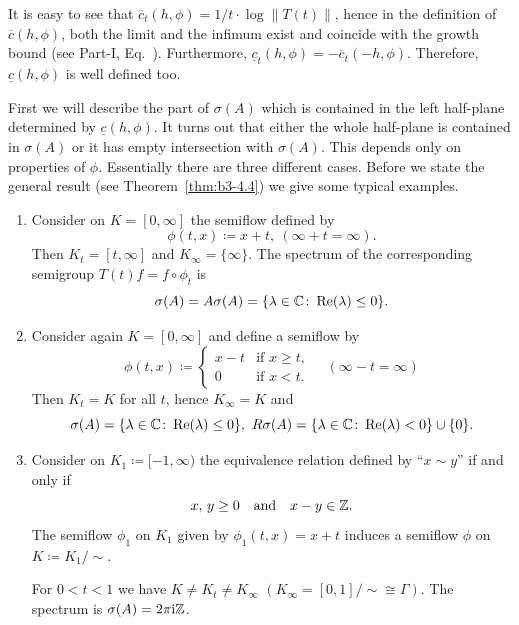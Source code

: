 It is easy to see that $\overline{c}_{t}(h,\phi) = 1/t\cdot\log\|T(t)\|$, hence in the definition of\/ $\overline{c}(h,\phi)$, both the limit and the infimum exist and coincide with the growth bound (see Part-I, Eq.~).
Furthermore, $\underline{c}_{t}(h,\phi) = -\overline{c}_{t}(-h,\phi)$.
Therefore, $\underline{c}(h,\phi)$ is well defined too.

First we will describe the part of\/ $\sigma(A)$ which is contained in the left half-plane determined by $\underline{c}(h,\phi)$.
It turns out that either the whole half-plane is contained in $\sigma(A)$ or it has empty intersection with $\sigma(A)$.
This depends only on properties of\/ $\phi$.
Essentially there 
are three different cases. 
Before we state the general result (see Theorem~\ref{thm:b3-4.4}) we give some typical examples.
\begin{examples}\label{ex:b3-4.3}
	\begin{enumerate}[\upshape (i), wide, labelindent=.25em]
	\item 
	Consider on $K = [0,\infty]$ the semiflow defined by 
    \[
    \phi(t,x) \coloneq x + t,\ (\infty + t = \infty) .
    \]
	Then $K_{t} = [t,\infty]$ and $K_{\infty} = \{\infty\}$.
	The spectrum of the corresponding semigroup $T(t)f = f\circ\phi_{t}$ is 
    \[
    \sigma(A) = A\sigma(A) = 
    \{\lambda \in \C \colon \Re(\lambda) \leq 0\} .
    \]
	
	\item 
	Consider again $K = [0,\infty]$ and define a semiflow by
	\[
	\phi(t,x) \coloneq \begin{cases} 
		x - t & \text{if } x \geq t  , \\
		0 & \text{if } x < t .
	\end{cases} \quad (\infty - t = \infty)
	\]
	Then $K_{t} = K$ for all $t$, hence $K_{\infty} = K$ and \[
    \sigma(A) = \{\lambda \in \C \colon \Re(\lambda) \leq 0\} ,  \ R\sigma(A) = \{\lambda \in \C \colon \Re(\lambda) < 0\} \cup \{0\} .
    \]
	
	\item 
	Consider on $K_{1} \coloneq [-1,\infty)$ the equivalence relation defined by
\enquote{$x \sim y$} if and only if
\[
    x,\,y \geq 0 \quad\text{and}\quad x - y \in \Z.
\]
The semiflow $\phi_{1}$ on $K_{1}$ given by $\phi_{1}(t,x) = x + t$
induces a semiflow $\phi$ on $K \coloneq K_{1}/{\sim}$.
    
	For $0 < t < 1$ we have $K \neq K_{t} \neq K_{\infty}$ $(K_{\infty} = [0,1]/{\sim} \cong \Gamma)$.
	The spectrum is $\sigma(A) = 2\pi \mathrm{i}\mathbb{Z}$.
	

\end{enumerate}
\end{examples}
